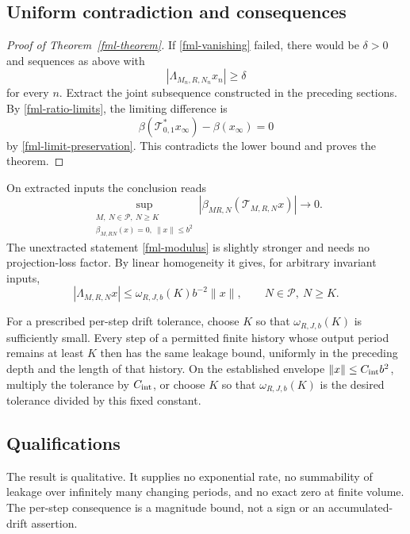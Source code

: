 \documentclass[11pt]{article}
\theoremstyle{remark}
\begin{document}
\subsection{Uniform contradiction and consequences}
\label{fml-proof-section}

\begin{proof}[Proof of Theorem~\ref{fml-theorem}]
If \eqref{fml-vanishing} failed, there would be
\(\delta>0\) and sequences as above with
\[
                     |\Lambda_{M_n,R,N_n}x_n|\ge\delta
\]
for every \(n\). Extract the joint subsequence constructed
in the preceding sections. By \eqref{fml-ratio-limits},
the limiting difference is
\[
 \beta(\mathcal T_{0,1}^*x_\infty)-\beta(x_\infty)=0
\]
by \eqref{fml-limit-preservation}. This contradicts the
lower bound and proves the theorem.
\end{proof}

On extracted inputs the conclusion reads
\begin{equation}
 \sup_{\substack{M,\ N\in\mathcal P,\ N\ge K\\
           \beta_{M,RN}(x)=0,\ \|x\|\le b^2}}
       |\beta_{MR,N}(\mathcal T_{M,R,N}x)|
                            \longrightarrow0.
 \label{fml-extracted-conclusion}
\end{equation}
The unextracted statement \eqref{fml-modulus} is slightly
stronger and needs no projection-loss factor. By linear
homogeneity it gives, for arbitrary invariant inputs,
\begin{equation}
 |\Lambda_{M,R,N}x|
       \le \omega_{R,J,b}(K)b^{-2}\|x\|,
       \qquad N\in\mathcal P,\ N\ge K.
 \label{fml-scaled-bound}
\end{equation}

For a prescribed per-step drift tolerance, choose \(K\)
so that \(\omega_{R,J,b}(K)\) is sufficiently small.
Every step of a permitted finite history whose output
period remains at least \(K\) then has the same leakage
bound, uniformly in the preceding depth and the length
of that history. On the established envelope
\(\|x\|\le C_{\rm int}b^2\), multiply the tolerance by
\(C_{\rm int}\), or choose \(K\) so that
\(\omega_{R,J,b}(K)\) is the desired tolerance divided
by this fixed constant.

\subsection{Qualifications}
\label{fml-scope-section}

The result is qualitative. It supplies no exponential
rate, no summability of leakage over infinitely many
changing periods, and no exact zero at finite volume.
The per-step consequence is a magnitude bound, not a
sign or an accumulated-drift assertion.
\end{document}
